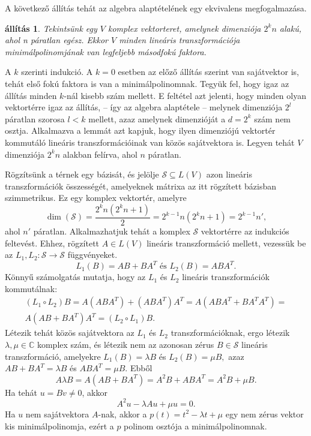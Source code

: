 \documentclass[9pt, a4paper, showtrims]{memoir}
\makeatletter
\renewenvironment{proof}[1][\proofname]
    {\par\pushQED{\qed}%
    \normalfont \topsep6\p@\@plus6\p@\relax
    \trivlist
    \item[\hskip\labelsep
        \itshape
    #1\@addpunct{:}]\ignorespaces}
    {\popQED\endtrivlist\@endpefalse}
\theoremstyle{plain}
\newtheorem{proposition}{állítás}[chapter]
\theoremstyle{remark}
\theoremstyle{definition}
\makeatother
\begin{document}
A következő állítás tehát az algebra alaptételének egy ekvivalens megfogalmazása.
\begin{proposition}
	Tekintsünk egy $V$ komplex vektorteret, amelynek dimenziója $2^kn$ alakú,
	ahol n páratlan egész.
	Ekkor $V$ minden lineáris transzformációja minimálpolinomjának
	van legfeljebb másodfokú faktora.
\end{proposition}
\begin{proof}
	A $k$ szerinti indukció.
	A $k=0$ esetben az előző állítás szerint van sajátvektor is,
	tehát első fokú faktora is van a minimálpolinomnak.
	Tegyük fel, hogy igaz az állítás minden $k$-nál kisebb szám mellett.
	E feltétel azt jelenti, hogy minden olyan vektortérre igaz az állítás,
	-- így az algebra alaptétele --
	melynek dimenziója $2^l$ páratlan szorosa $l<k$ mellett,
	azaz amelynek dimenzióját a $d=2^k$ szám nem osztja.
	Alkalmazva a lemmát azt kapjuk, hogy ilyen dimenziójú vektortér kommutáló
	lineáris transzformációinak van közös sajátvektora is.
	Legyen tehát $V$ dimenziója $2^kn$ alakban felírva, ahol $n$ páratlan.

	Rögzítsünk a térnek egy bázisát, és jelölje
	\(
	\mathcal{S}\subseteq L(V)
	\)
	azon lineáris transzformációk összességét,
	amelyeknek mátrixa az itt rögzített bázisban szimmetrikus.
	Ez egy komplex vektortér,
	amelyre
	\[
        \dim\left( \mathcal{S} \right)=
		\frac{2^kn\left( 2^kn+1 \right)}{2}=
		2^{k-1}n\left(2^kn+1  \right)=
		2^{k-1}n',
	\]
	ahol $n'$ páratlan.
	Alkalmazhatjuk tehát a komplex $\mathcal{S}$ vektortérre az indukciós feltevést.
	Ehhez, rögzített $A\in L\left( V \right)$ lineáris transzformáció mellett,
	vezessük be az $L_1,L_2:\mathcal{S}\to\mathcal{S}$ függvényeket.
	\[
		L_1\left( B \right)=AB+BA^T \text{ és }
		L_2\left( B \right)=ABA^T.
	\]
	Könnyű számolgatás mutatja, hogy az $L_1$ és $L_2$ lineáris transzformációk kommutálnak:
	\begin{multline*}
		\left( L_1\circ L_2\right)B=
		A\left( ABA^T \right)+\left( ABA^T \right)A^T=
		A\left( ABA^T+BA^TA^T \right)
		=\\
		A\left( AB+BA^T \right)A^T =
		\left( L_2\circ L_1 \right)B.
	\end{multline*}
	Létezik tehát közös sajátvektora az $L_1$ és $L_2$ transzformációknak, ergo
	létezik $\lambda,\mu\in\mathbb{C}$ komplex szám,
	és létezik nem az azonosan zérus $B\in\mathcal{S}$ lineáris transzformáció,
	amelyekre
	$
		L_1\left( B \right)=\lambda B
	$
	és
	$
		L_2\left( B \right)=\mu B,
	$
	azaz
	$
		AB+BA^T=\lambda B
	$
	és
	$
		ABA^T=\mu B.
	$
	Ebből
	\[
		A\lambda B=
		A\left( AB+BA^T \right)=
		A^2B + ABA^T=
		A^2B + \mu B.
	\]
	Ha tehát $u=Bv\neq 0$, akkor
	\[
		A^2u-\lambda Au+\mu u=0.
	\]
	Ha $u$ nem sajátvektora $A$-nak, akkor a
	$p\left( t \right)=t^2-\lambda t+\mu$
	egy nem zérus vektor kis minimálpolinomja,
	ezért a $p$ polinom osztója a minimálpolinomnak.
\end{proof}
\end{document}
